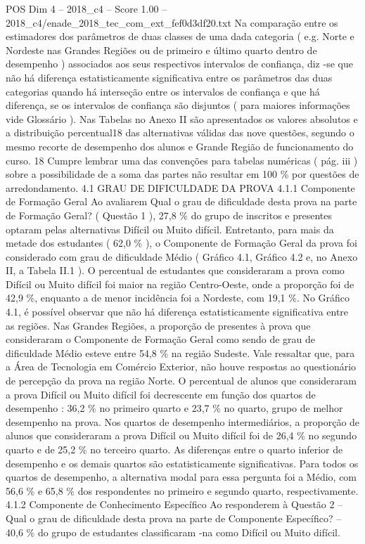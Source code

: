 \begin{textsample}{POS Dim 4 – 2018\_c4 – Score 1.00 – 2018\_c4/enade\_2018\_tec\_com\_ext\_fef0d3df20.txt}
Na comparação entre os estimadores dos parâmetros de duas classes de uma dada categoria ( e.g.
Norte e Nordeste nas Grandes Regiões ou de primeiro e último quarto dentro de desempenho ) associados aos seus respectivos intervalos de confiança, diz -se que não há diferença estatisticamente significativa entre os parâmetros das duas categorias quando há interseção entre os intervalos de confiança e que há diferença, se os intervalos de confiança são disjuntos ( para maiores informações vide Glossário ).
Nas Tabelas no Anexo II são apresentados os valores absolutos e a distribuição percentual18 das alternativas válidas das nove questões, segundo o mesmo recorte de desempenho dos alunos e Grande Região de funcionamento do curso. 18 Cumpre lembrar uma das convenções para tabelas numéricas ( pág. iii ) sobre a possibilidade de a soma das partes não resultar em 100 \% por questões de arredondamento. 4.1 GRAU DE DIFICULDADE DA PROVA 4.1.1 Componente de Formação Geral Ao avaliarem Qual o grau de dificuldade desta prova na parte de Formação Geral? ( Questão 1 ), 27,8 \% do grupo de inscritos e presentes optaram pelas alternativas Difícil ou Muito difícil.
Entretanto, para mais da metade dos estudantes ( 62,0 \% ), o Componente de Formação Geral da prova foi considerado com grau de dificuldade Médio ( Gráfico 4.1, Gráfico 4.2 e, no Anexo II, a Tabela II.1 ).
O percentual de estudantes que consideraram a prova como Difícil ou Muito difícil foi maior na região Centro-Oeste, onde a proporção foi de 42,9 \%, enquanto a de menor incidência foi a Nordeste, com 19,1 \%.
No Gráfico 4.1, é possível observar que não há diferença estatisticamente significativa entre as regiões.
Nas Grandes Regiões, a proporção de presentes à prova que consideraram o Componente de Formação Geral como sendo de grau de dificuldade Médio esteve entre 54,8 \% na região Sudeste.
Vale ressaltar que, para a Área de Tecnologia em Comércio Exterior, não houve respostas ao questionário de percepção da prova na região Norte.
O percentual de alunos que consideraram a prova Difícil ou Muito difícil foi decrescente em função dos quartos de desempenho : 36,2 \% no primeiro quarto e 23,7 \% no quarto, grupo de melhor desempenho na prova.
Nos quartos de desempenho intermediários, a proporção de alunos que consideraram a prova Difícil ou Muito difícil foi de 26,4 \% no segundo quarto e de 25,2 \% no terceiro quarto.
As diferenças entre o quarto inferior de desempenho e os demais quartos são estatisticamente significativas.
Para todos os quartos de desempenho, a alternativa modal para essa pergunta foi a Médio, com 56,6 \% e 65,8 \% dos respondentes no primeiro e segundo quarto, respectivamente. 4.1.2 Componente de Conhecimento Específico Ao responderem à Questão 2 – Qual o grau de dificuldade desta prova na parte de Componente Específico? – 40,6 \% do grupo de estudantes classificaram -na como Difícil ou Muito difícil.

\end{textsample}
